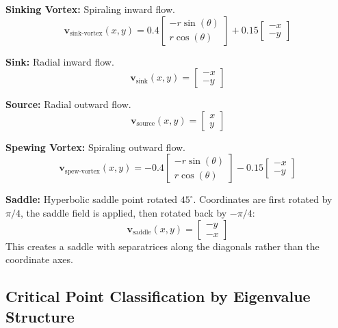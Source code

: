 \documentclass[lettersize,journal]{IEEEtran}
\begin{document}
\textbf{Sinking Vortex:} Spiraling inward flow.
\begin{equation}
\mathbf{v}_{\text{sink-vortex}}(x, y) = 0.4 \begin{bmatrix} -r \sin(\theta) \\ r \cos(\theta) \end{bmatrix} + 0.15 \begin{bmatrix} -x \\ -y \end{bmatrix}
\end{equation}

\textbf{Sink:} Radial inward flow.
\begin{equation}
\mathbf{v}_{\text{sink}}(x, y) = \begin{bmatrix} -x \\ -y \end{bmatrix}
\end{equation}

\textbf{Source:} Radial outward flow.
\begin{equation}
\mathbf{v}_{\text{source}}(x, y) = \begin{bmatrix} x \\ y \end{bmatrix}
\end{equation}

\textbf{Spewing Vortex:} Spiraling outward flow.
\begin{equation}
\mathbf{v}_{\text{spew-vortex}}(x, y) = -0.4 \begin{bmatrix} -r \sin(\theta) \\ r \cos(\theta) \end{bmatrix} - 0.15 \begin{bmatrix} -x \\ -y \end{bmatrix}
\end{equation}

\textbf{Saddle:} Hyperbolic saddle point rotated $45^\circ$. Coordinates are first rotated by $\pi/4$, the saddle field is applied, then rotated back by $-\pi/4$:
\begin{equation}
\mathbf{v}_{\text{saddle}}(x, y) = \begin{bmatrix} -y \\ -x \end{bmatrix}
\end{equation}
This creates a saddle with separatrices along the diagonals rather than the coordinate axes.

\subsection{Critical Point Classification by Eigenvalue Structure}
\end{document}
